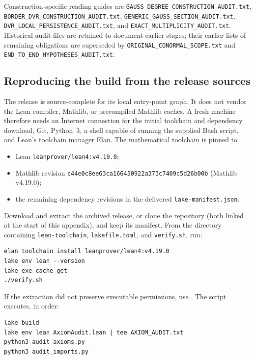 Construction-specific reading guides are
\nolinkurl{GAUSS_DEGREE_CONSTRUCTION_AUDIT.txt},
\nolinkurl{BORDER_DVR_CONSTRUCTION_AUDIT.txt},
\nolinkurl{GENERIC_GAUSS_SECTION_AUDIT.txt},
\nolinkurl{DVR_LOCAL_PERSISTENCE_AUDIT.txt}, and
\nolinkurl{EXACT_MULTIPLICITY_AUDIT.txt}.  Historical audit files are
retained to document earlier stages; their earlier lists of remaining
obligations are superseded by \nolinkurl{ORIGINAL_CONORMAL_SCOPE.txt} and
\nolinkurl{END_TO_END_HYPOTHESES_AUDIT.txt}.

\subsection{Reproducing the build from the release sources}
\label{app:lean-reproduce}

The release is source-complete for its local entry-point graph.  It does
not vendor the Lean compiler, Mathlib, or precompiled Mathlib caches.
A fresh machine therefore needs an Internet connection for the initial
toolchain and dependency download, Git, Python~3, a shell capable of
running the supplied Bash script, and Lean's toolchain manager Elan.
The mathematical toolchain is pinned to
\begin{itemize}[leftmargin=*]
\item Lean \nolinkurl{leanprover/lean4:v4.19.0};
\item Mathlib revision
\nolinkurl{c44e0c8ee63ca166450922a373c7409c5d26b00b}
(Mathlib v4.19.0);
\item the remaining dependency revisions in the delivered
\nolinkurl{lake-manifest.json}.
\end{itemize}
Download and extract the archived release, or clone the repository (both linked at the start of this appendix), and keep its manifest.  From the
directory containing \nolinkurl{lean-toolchain}, \nolinkurl{lakefile.toml},
and \nolinkurl{verify.sh}, run:

\begingroup\small
\begin{verbatim}
elan toolchain install leanprover/lean4:v4.19.0
lake env lean --version
lake exe cache get
./verify.sh
\end{verbatim}
\endgroup

If the extraction did not preserve executable permissions, use
\texttt{}.  The script executes, in order:

\begingroup\small
\begin{verbatim}
lake build
lake env lean AxiomAudit.lean | tee AXIOM_AUDIT.txt
python3 audit_axioms.py
python3 audit_imports.py
\end{verbatim}
\endgroup

